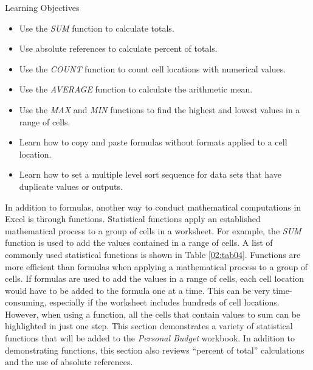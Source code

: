 \begin{center}
	\begin{objbox}{Learning Objectives}
		\begin{itemize}
			\setlength{\itemsep}{0pt}
			\setlength{\parskip}{0pt}
			\setlength{\parsep}{0pt}
			
			\item Use the \textit{SUM} function to calculate totals.
			\item Use absolute references to calculate percent of totals.
			\item Use the \textit{COUNT} function to count cell locations with numerical values.
			\item Use the \textit{AVERAGE} function to calculate the arithmetic mean.
			\item Use the \textit{MAX} and \textit{MIN} functions to find the highest and lowest values in a range of cells.
			\item Learn how to copy and paste formulas without formats applied to a cell location.
			\item Learn how to set a multiple level sort sequence for data sets that have duplicate values or outputs.
			
 		\end{itemize}
	\end{objbox}
\end{center}

In addition to formulas, another way to conduct mathematical computations in Excel is through functions. Statistical functions apply an established mathematical process to a group of cells in a worksheet. For example, the \textit{SUM} function is used to add the values contained in a range of cells. A list of commonly used statistical functions is shown in Table \ref{02:tab04}. Functions are more efficient than formulas when applying a mathematical process to a group of cells. If formulas are used to add the values in a range of cells, each cell location would have to be added to the formula one at a time. This can be very time-consuming, especially if the worksheet includes hundreds of cell locations. However, when using a function, all the cells that contain values to sum can be highlighted in just one step. This section demonstrates a variety of statistical functions that will be added to the \textit{Personal Budget} workbook. In addition to demonstrating functions, this section also reviews ``percent of total'' calculations and the use of absolute references.

